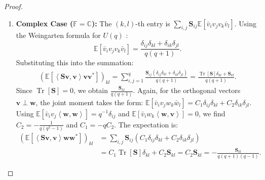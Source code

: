 \documentclass[noinfoline]{imsart}\setcounter{tocdepth}{2}
\renewcommand{\b}[1]{\mathbb{#1}} %
\newcommand{\m}[1]{\mathbf{#1}} %
\newcommand{\tr}[1]{\operatorname{Tr}\left[#1\right]}
\newcommand{\innpr}[2]{{\left\langle {#1},{#2}\right\rangle}} %
\theoremstyle{plain}
\begin{document}
\begin{appendix}
\begin{proof}
\begin{enumerate}[leftmargin = *]
\item \textbf{Complex Case ($\b{F} = \b{C}$):}
The $(k,l)$-th entry is $\sum_{i,j} \m{S}_{ij} \b{E}[\bar{v}_i v_j v_k \bar{v}_l]$.
Using the Weingarten formula for $U(q)$ \cite{collins2006integration}:
\begin{equation*}
    \b{E} [\bar{v}_{i} v_{j} v_{k} \bar{v}_{l}] = \frac{\delta_{ij}\delta_{kl} + \delta_{ik}\delta_{jl}}{q(q+1)}.
\end{equation*}
Substituting this into the summation:
\begin{align*}
    \left( \b{E} [\innpr{\m{S}\m{v}}{\m{v}} \m{v} \m{v}^{*}] \right)_{kl} = \sum_{i,j=1}^{q} \frac{\m{S}_{ij} (\delta_{ij}\delta_{kl} + \delta_{ik}\delta_{jl})}{q(q+1)} 
    = \frac{\tr{\m{S}}\delta_{kl} + \m{S}_{kl}}{q(q+1)}.
\end{align*}
Since $\tr{\m{S}}=0$, we obtain $\frac{\m{S}_{kl}}{q(q+1)}$.
Again, for the orthogonal vectors $\m{v} \perp \m{w}$, the joint moment takes the form: $\b{E}[\bar{v}_i v_j w_k \bar{w}_l] = C_1 \delta_{ij}\delta_{kl} + C_2 \delta_{ik}\delta_{jl}$.
Using $\b{E}[\bar{v}_i v_j \innpr{\m{w}}{\m{w}}] = q^{-1}\delta_{ij}$ and $\b{E}[\bar{v}_i w_k \innpr{\m{w}}{\m{v}}] = 0$, we find $C_2 = - \frac{1}{q(q^2-1)}$ and $C_1 = - q C_2$.
The expectation is:
\begin{align*}
    \left( \b{E} [\innpr{\m{S}\m{v}}{\m{v}} \m{w} \m{w}^{*}] \right)_{kl} &= \sum_{i,j} \m{S}_{ij} (C_1 \delta_{ij}\delta_{kl} + C_2 \delta_{ik}\delta_{jl}) \\
    &= C_1 \tr{\m{S}} \delta_{kl} + C_2 \m{S}_{kl}
    = C_2 \m{S}_{kl} = - \frac{\m{S}_{kl}}{q(q+1)(q-1)}.
\end{align*}
\end{enumerate}
\end{proof}


\end{appendix}
\end{document}
